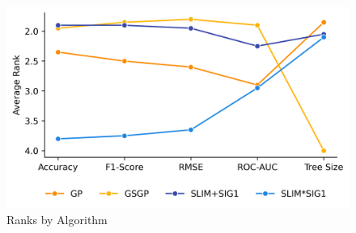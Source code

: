 
    \begin{figure}[H]
    \centering
    \includegraphics[width=\linewidth]{../Latex/Chapters/Figures/Results/RQ_Comparison_ranks.png}
    \caption{Ranks by Algorithm}
    \label{fig:RQ_Comparison_ranks}
    \end{figure}
    